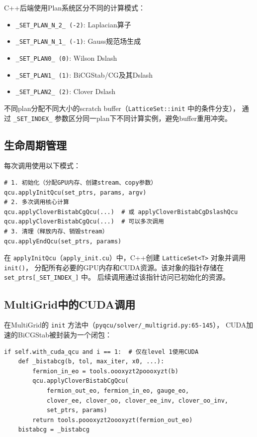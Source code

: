 \documentclass[11pt,a4paper]{article}
\begin{document}
C++后端使用Plan系统区分不同的计算模式：

\begin{itemize}
    \item \texttt{\_SET\_PLAN\_N\_2\_ (-2)}: Laplacian算子
    \item \texttt{\_SET\_PLAN\_N\_1\_ (-1)}: Gauss规范场生成
    \item \texttt{\_SET\_PLAN0\_ (0)}: Wilson Dslash
    \item \texttt{\_SET\_PLAN1\_ (1)}: BiCGStab/CG及其Dslash
    \item \texttt{\_SET\_PLAN2\_ (2)}: Clover Dslash
\end{itemize}

不同plan分配不同大小的scratch buffer（\texttt{LatticeSet::init} 中的条件分支），
通过 \texttt{\_SET\_INDEX\_} 参数区分同一plan下不同计算实例，避免buffer重用冲突。

\subsection{生命周期管理}

每次调用使用以下模式：

\begin{lstlisting}[style=pythonstyle]
# 1. 初始化（分配GPU内存、创建stream、copy参数）
qcu.applyInitQcu(set_ptrs, params, argv)
# 2. 多次调用核心计算
qcu.applyCloverBistabCgQcu(...)  # 或 applyCloverBistabCgDslashQcu
qcu.applyCloverBistabCgQcu(...)  # 可以多次调用
# 3. 清理（释放内存、销毁stream）
qcu.applyEndQcu(set_ptrs, params)
\end{lstlisting}

在 \texttt{applyInitQcu}（\texttt{apply\_init.cu}）中，C++创建 \texttt{LatticeSet<T>} 对象并调用 \texttt{init()}，
分配所有必要的GPU内存和CUDA资源。该对象的指针存储在 \texttt{set\_ptrs[\_SET\_INDEX\_]} 中。
后续调用通过该指针访问已初始化的资源。

\subsection{MultiGrid中的CUDA调用}

在MultiGrid的 \texttt{init} 方法中（\texttt{pyqcu/solver/\_multigrid.py:65-145}），
CUDA加速的BiCGStab被封装为一个闭包：

\begin{lstlisting}[style=pythonstyle]
if self.with_cuda_qcu and i == 1:  # 仅在level 1使用CUDA
    def _bistabcg(b, tol, max_iter, x0, ...):
        fermion_in_eo = tools.oooxyzt2poooxyzt(b)
        qcu.applyCloverBistabCgQcu(
            fermion_out_eo, fermion_in_eo, gauge_eo,
            clover_ee, clover_oo, clover_ee_inv, clover_oo_inv,
            set_ptrs, params)
        return tools.poooxyzt2oooxyzt(fermion_out_eo)
    bistabcg = _bistabcg
\end{lstlisting}
\end{document}
